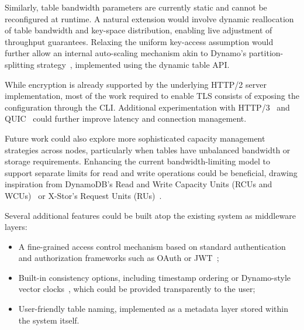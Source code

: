 Similarly, table bandwidth parameters are currently static and cannot be reconfigured at runtime.
A natural extension would involve dynamic reallocation of table bandwidth and key-space distribution,
enabling live adjustment of throughput guarantees.
Relaxing the uniform key-access assumption would further allow
an internal auto-scaling mechanism akin to Dynamo’s partition-splitting strategy~\cite{Dynamo2007},
implemented using the dynamic table API\@.

While encryption is already supported by the underlying HTTP/2 server implementation,
most of the work required to enable TLS consists of exposing the configuration through the CLI\@.
Additional experimentation with HTTP/3~\cite{HTTP3} and QUIC~\cite{QUIC} could further improve latency and connection management.

Future work could also explore more sophisticated capacity management strategies across nodes,
particularly when tables have unbalanced bandwidth or storage requirements.
Enhancing the current bandwidth-limiting model to support separate limits for read and write operations
could be beneficial, drawing inspiration from DynamoDB’s Read and Write Capacity Units (RCUs and WCUs)~\cite{Dynamo2022, DynamoWhitepaper}
or X-Stor’s Request Units (RUs)~\cite{XStor}.

Several additional features could be built atop the existing system as middleware layers:
\begin{itemize}
    \item A fine-grained access control mechanism based on standard authentication and authorization frameworks such as OAuth or JWT~\cite{OAuth2, JWT};
    \item Built-in consistency options, including timestamp ordering or Dynamo-style vector clocks~\cite{Dynamo2007}, which could be provided transparently to the user;
    \item User-friendly table naming, implemented as a metadata layer stored within the system itself.
\end{itemize}
